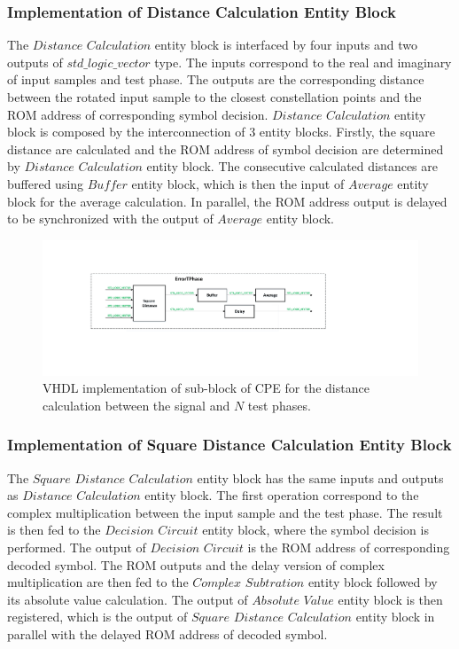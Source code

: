 \begin{refsection}
\subsubsection{Implementation of Distance Calculation Entity Block}

The $\textit{Distance Calculation}$ entity block is interfaced by four inputs and two outputs of $\textit{std\_logic\_vector}$ type. The inputs correspond to the real and imaginary of input samples and test phase. The outputs are the corresponding distance between the rotated input sample to the closest constellation points and the ROM address of corresponding symbol decision.
$\textit{Distance Calculation}$ entity block is composed by the interconnection of 3 entity blocks. Firstly, the square distance are calculated and the ROM address of symbol decision are determined by $\textit{Distance Calculation}$ entity block. The consecutive calculated distances are buffered using $\textit{Buffer}$ entity block, which is then the input of $\textit{Average}$ entity block for the average calculation. In parallel, the ROM address output is delayed to be synchronized with the output of $\textit{Average}$ entity block.

\begin{figure}[h!]
    \centering
    \includegraphics[width=12cm]{./sdf/dsp_laser_phase_compensation/figures/errorTphase.pdf}
    \caption{VHDL implementation of sub-block of CPE for the distance calculation between the signal and $N$ test phases.}
    \label{fig_DCVhdlL1}
\end{figure}


\subsubsection{Implementation of Square Distance Calculation Entity Block}

The $\textit{Square Distance Calculation}$ entity block has the same inputs and outputs as $\textit{Distance Calculation}$ entity block. The first operation correspond to the complex multiplication between the input sample and the test phase. The result is then fed to the $\textit{Decision Circuit}$ entity block, where the symbol decision is performed. The output of $\textit{Decision Circuit}$ is the ROM address of corresponding decoded symbol. The ROM outputs and the delay version of complex multiplication are then fed to the $\textit{Complex Subtration}$ entity block followed by its absolute value calculation. The output of $\textit{Absolute Value}$ entity block is then registered, which is the output of $\textit{Square Distance Calculation}$ entity block in parallel with the delayed ROM address of decoded symbol.



\end{refsection}
